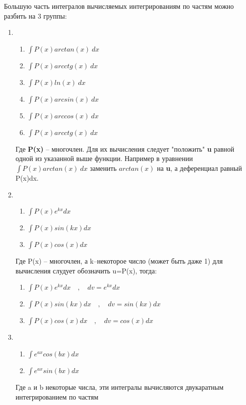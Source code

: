 \documentclass[a4paper]{article}
\begin{document}
	Большую часть интегралов вычисляемых интегрированиям по частям можно разбить на 3 группы:
	\begin{enumerate}
		\item 
		\begin{enumerate}
			\item \( \int P(x) arctan(x)\:dx \)
			\item \( \int P(x) arcctg(x)\:dx \)
			\item \( \int P(x) ln(x)\:dx \)
			\item \( \int P(x) arcsin(x)\:dx \)
			\item \( \int P(x) arccos(x)\:dx \)
			\item \( \int P(x) arcctg(x)\:dx \)
		\end{enumerate}
		\begin{itshape}
			Где \textbf{P(x)} -- многочлен. Для их вычисления следует "положить"  \textbf{u} равной одной из указанной выше функции. Например в уравнении \( \int P(x) arctan(x)\:dx \) заменить \(arctan(x)\) на \textbf{u}, а деференциал равный P(x)dx.%
		\end{itshape}
		\item 
		\begin{enumerate}
			\item \( \int P(x) e^{kx}dx\)
			\item \( \int P(x) sin(kx)dx\)
			\item \( \int P(x) cos(x)dx\)
		\end{enumerate}
		\begin{itshape}
			Где P(x) -- многочлен, а k--некоторое число (может быть даже 1)  для вычисления слудует обозначить u=P(x), тогда:
		\end{itshape}
		\begin{enumerate}
			\item \( \int P(x) e^{kx}dx\quad,\quad dv = e^{kx}dx\)
			\item \( \int P(x) sin(kx)dx\quad,\quad dv = sin(kx)dx\)
			\item \( \int P(x) cos(x)dx\quad,\quad dv = cos(x)dx\)
		\end{enumerate}
		\item 
		\begin{enumerate}
			\item \( \int e^{ax}cos(bx)dx\)
			\item \( \int e^{ax}sin(bx)dx\)
		\end{enumerate}
		\begin{itshape}
			Где a и b некоторые числа, эти интегралы вычисляются двукаратным интегрированием по частям
		\end{itshape}
	\end{enumerate}
\end{document}
